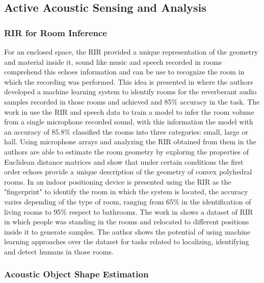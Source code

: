 \subsection{Active Acoustic Sensing and Analysis}

\subsubsection{RIR for Room Inference}

For an enclosed space, the RIR provided a unique representation of the geometry and material inside it, sound like music and speech recorded in rooms comprehend this echoes information and can be use to recognize the room in which the recording was performed. This idea is presented in \cite{RIR05} where the authors developed a machine learning system to identify rooms for the reverberant audio samples recorded in those rooms and achieved and 85\% accuracy in the task. The work in \cite{RIR06} use the RIR and speech data to train a model to infer the room volume from a single microphone recorded sound, with this information the model with an accuracy of 85.8\% classified the rooms into three categories: small, large or hall. Using microphone arrays and analyzing the RIR obtained from them in \cite{RIR07} the authors are able to estimate the room geometry by exploring the properties of Euclidean distance matrices and show that under certain conditions the first order echoes provide a unique description of the geometry of convex polyhedral rooms. In \cite{RIR08} an indoor positioning device is presented using the RIR as the "fingerprint" to identify the room in which the system is located, the accuracy varies depending of the type of room, ranging from 65\% in the identification of living rooms to 95\% respect to bathrooms. The work in \cite{RIR09} shows a dataset of RIR in which people was standing in the rooms and relocated to different positions inside it to generate samples. The author shows the potential of using machine learning approaches over the dataset for tasks related to localizing, identifying and detect humans in those rooms.      

\subsubsection{Acoustic Object Shape Estimation}

